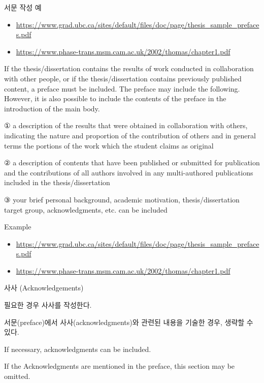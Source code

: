 \documentclass[11pt]{report}
\numberwithin{figure}{section}
\theoremstyle{plain}
\theoremstyle{definition}
\theoremstyle{corollary}
\theoremstyle{definition}
\theoremstyle{plain}
\theoremstyle{definition}
\theoremstyle{plain}
\begin{document}
\bigskip
서문 작성 예
\begin{itemize}
\item\url{https://www.grad.ubc.ca/sites/default/files/doc/page/thesis_sample_prefaces.pdf}
\item\url{https://www.phase-trans.msm.cam.ac.uk/2002/thomas/chapter1.pdf}
\end{itemize}

\bigskip
If the thesis/dissertation contains the results of work conducted in collaboration with other people, or if the thesis/dissertation contains previously published content, a preface must be included.
The preface may include the following.
However, it is also possible to include the contents of the preface in the introduction of the main body.

① a description of the results that were obtained in collaboration with others, indicating the nature and proportion of the contribution of others and in general terms the portions of the work which the student claims as original

② a description of contents that have been published or submitted for publication and the contributions of all authors involved in any multi-authored publications included in the thesis/dissertation

③ your brief personal background, academic motivation, thesis/dissertation target group, acknowledgments, etc. can be included 

\bigskip
Example
\begin{itemize}
\item\url{https://www.grad.ubc.ca/sites/default/files/doc/page/thesis_sample_prefaces.pdf}
\item\url{https://www.phase-trans.msm.cam.ac.uk/2002/thomas/chapter1.pdf}
\end{itemize}

\newpage
\begin{center}
\large
사사 (Acknowledgements)
\end{center}
\normalsize
필요한 경우 사사를 작성한다.

서문(preface)에서 사사(acknowledgments)와 관련된 내용을 기술한 경우, 생략할 수 있다.

If necessary, acknowledgments can be included.

If the Acknowledgments are mentioned in the preface, this section may be omitted.  
\end{document}
